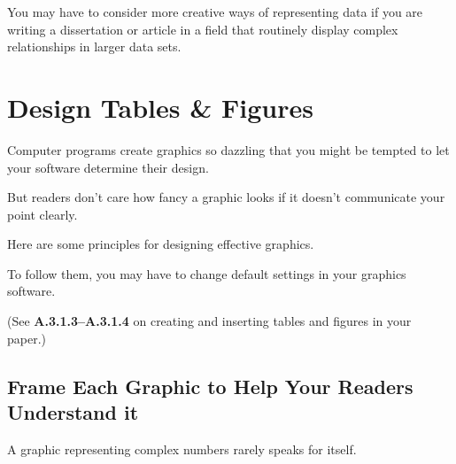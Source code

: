 \documentclass[oneside]{book}
\numberwithin{equation}{section}
\begin{document}
You may have to consider more creative ways of representing data if you are writing a dissertation or article in a field that routinely display complex relationships in larger data sets.

\section{Design Tables \& Figures}
Computer programs create graphics so dazzling that you might be tempted to let your software determine their design.

But readers don't care how fancy a graphic looks if it doesn't communicate your point clearly.

Here are some principles for designing effective graphics.

To follow them, you may have to change default settings in your graphics software.

(See \textbf{A.3.1.3--A.3.1.4} on creating and inserting tables and figures in your paper.)

\subsection{Frame Each Graphic to Help Your Readers Understand it}
A graphic representing complex numbers rarely speaks for itself.
\end{document}
